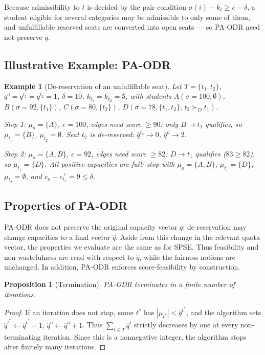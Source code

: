 \documentclass[10pt]{article}
\newtheorem{proposition}{Proposition}
\newtheorem{example}{Example}
\newcommand{\1}{\mathbf{1}}
\begin{document}
Because admissibility to $t$ is decided by the pair condition $\sigma(i)+k_t\ge e-\delta$, a student eligible for several categories may be admissible to only some of them, and unfulfillable reserved seats are converted into open seats — so PA-ODR need not preserve $q$.

\subsection{Illustrative Example: PA-ODR}

\begin{example}[De-reservation of an unfulfillable seat]
Let $T=\{t_1,t_2\}$, $q^o=q^{t_1}=q^{t_2}=1$, $\delta=10$, $k_{t_1}=k_{t_2}=5$, with students $A(\sigma=100,\emptyset)$, $B(\sigma=92,\{t_1\})$, $C(\sigma=80,\{t_2\})$, $D(\sigma=78,\{t_1,t_2\},\,t_2\succ_D t_1)$.

\emph{Step 1:} $\mu_o=\{A\}$, $e=100$, edges need score $\ge90$: only $B\to t_1$ qualifies, so $\mu_{t_1}=\{B\}$, $\mu_{t_2}=\emptyset$. Seat $t_2$ is de-reserved: $\hat q^{t_2}\to0$, $\hat q^o\to2$.

\emph{Step 2:} $\mu_o=\{A,B\}$, $e=92$, edges need score $\ge82$: $D\to t_1$ qualifies ($83\ge82$), so $\mu_{t_1}=\{D\}$. All positive capacities are full; stop with $\mu_o=\{A,B\}$, $\mu_{t_1}=\{D\}$, $\mu_{t_2}=\emptyset$, and $e_o-e_{t_1}^+=9\le\delta$.
\end{example}

\subsection{Properties of PA-ODR}

PA-ODR does not preserve the original capacity vector $q$: de-reservation may change capacities to a final vector $\hat q$. Aside from this change in the relevant quota vector, the properties we evaluate are the same as for SPSE. Thus feasibility and non-wastefulness are read with respect to $\hat q$, while the fairness notions are unchanged. In addition, PA-ODR enforces score-feasibility by construction.

\begin{proposition}[Termination]\label{prop:pa-odr-termination}
PA-ODR terminates in a finite number of iterations.
\end{proposition}
\begin{proof}
If an iteration does not stop, some $t^\ast$ has $|\mu_{t^\ast}|<\hat q^{t^\ast}$, and the algorithm sets $\hat q^{t^\ast}\gets\hat q^{t^\ast}-1$, $\hat q^o\gets\hat q^o+1$. Thus $\sum_{t\in T}\hat q^t$ strictly decreases by one at every non-terminating iteration. Since this is a nonnegative integer, the algorithm stops after finitely many iterations.
\end{proof}
\end{document}
